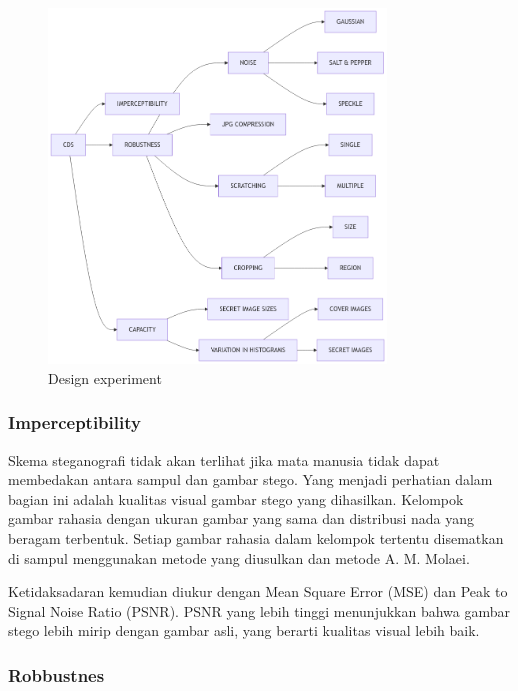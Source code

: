 \documentclass{ittelkom}
\begin{document}
\begin{figure}[!htb]
    \centering
    \includegraphics[width=0.8\textwidth]{gambar/experiment.png}
    \caption{Design experiment}
    \label{fig:experiment}
\end{figure}

\subsubsection{Imperceptibility}


Skema steganografi tidak akan terlihat jika mata manusia tidak dapat membedakan
antara sampul dan gambar stego. Yang menjadi perhatian dalam bagian ini adalah
kualitas visual gambar stego yang dihasilkan. Kelompok gambar rahasia dengan
ukuran gambar yang sama dan distribusi nada yang beragam terbentuk. Setiap
gambar rahasia dalam kelompok tertentu disematkan di sampul menggunakan metode
yang diusulkan dan metode A. M. Molaei.

Ketidaksadaran kemudian diukur dengan Mean Square Error (MSE) dan Peak to
Signal Noise Ratio (PSNR). PSNR yang lebih tinggi menunjukkan bahwa gambar
stego lebih mirip dengan gambar asli, yang berarti kualitas visual lebih baik.

\subsubsection{Robbustnes}
\end{document}

